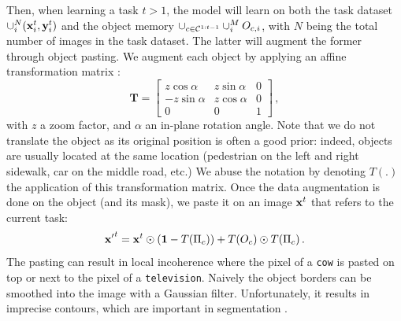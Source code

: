 Then, when learning a task $t > 1$, the model will learn on both the task dataset $\cup_i^N
    (\mathbf{x}^t_i, \mathbf{y}^t_i)$ and the object memory $\cup_{c \in \mathcal{C}^{1:t-1}} \cup_i^M O_{c,i}$, with $N$
being the total number of images in the task dataset. The latter will augment the former through
object pasting. We augment each object by applying an affine transformation matrix
\citep{fang2019instaboost}:
%
\begin{equation}
    \mathbf{T}=\left[\begin{array}{ccc}
            z \cos \alpha  & z \sin \alpha & 0 \\
            -z \sin \alpha & z \cos \alpha & 0 \\
            0              & 0             & 1
        \end{array}\right]\,,
    \label{eq:seg_transformation_matrix_complex}
\end{equation}
%
\noindent with $z$ a zoom factor, and $\alpha$ an in-plane rotation angle. Note that we do not
translate the object as its original position is often a good prior: indeed, objects are usually
located at the same location (\eg pedestrian on the left and right sidewalk, car on the middle
road, etc.) We abuse the notation by denoting $T(.)$ the application of this transformation matrix.
Once the data augmentation is done on the object (and its mask), we paste it on an image $\mathbf{x}^t$ that
refers to the current task:
%
\begin{equation}
    {\mathbf{x}'}^t = \mathbf{x}^t \odot (\mathbf{1} - T(\Pi_c)) + T(O_c) \odot T(\Pi_c)\,.
    \label{eq:seg_pasting}
\end{equation}
%
The pasting can result in local incoherence where the pixel of a \texttt{cow} is pasted on top or
next to the pixel of a \texttt{television}. Naively the object borders can be smoothed into the
image with a Gaussian filter. Unfortunately, it results in imprecise contours, which are important in
segmentation \citep{chen2020semeda}.

